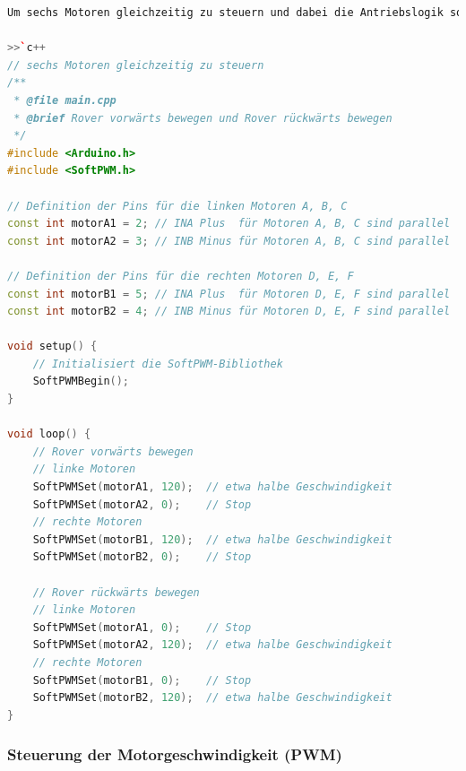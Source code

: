 \documentclass{vorlage-design-main}
\begin{document}
\begin{lstlisting}[language={C++}]
Um sechs Motoren gleichzeitig zu steuern und dabei die Antriebslogik sowie die Nutzung der SoftPWM-Bibliothek für das Arduino-Board zu berücksichtigen, muss der vorgegebene Code erweitert werden.

>>`c++
// sechs Motoren gleichzeitig zu steuern
/**
 * @file main.cpp
 * @brief Rover vorwärts bewegen und Rover rückwärts bewegen
 */
#include <Arduino.h>
#include <SoftPWM.h>

// Definition der Pins für die linken Motoren A, B, C
const int motorA1 = 2; // INA Plus  für Motoren A, B, C sind parallel
const int motorA2 = 3; // INB Minus für Motoren A, B, C sind parallel

// Definition der Pins für die rechten Motoren D, E, F
const int motorB1 = 5; // INA Plus  für Motoren D, E, F sind parallel
const int motorB2 = 4; // INB Minus für Motoren D, E, F sind parallel

void setup() {
    // Initialisiert die SoftPWM-Bibliothek
    SoftPWMBegin();
}

void loop() {
    // Rover vorwärts bewegen
    // linke Motoren
    SoftPWMSet(motorA1, 120);  // etwa halbe Geschwindigkeit
    SoftPWMSet(motorA2, 0);    // Stop
    // rechte Motoren
    SoftPWMSet(motorB1, 120);  // etwa halbe Geschwindigkeit
    SoftPWMSet(motorB2, 0);    // Stop

    // Rover rückwärts bewegen
    // linke Motoren
    SoftPWMSet(motorA1, 0);    // Stop
    SoftPWMSet(motorA2, 120);  // etwa halbe Geschwindigkeit
    // rechte Motoren
    SoftPWMSet(motorB1, 0);    // Stop
    SoftPWMSet(motorB2, 120);  // etwa halbe Geschwindigkeit
}
\end{lstlisting}

\hypertarget{steuerung-der-motorgeschwindigkeit-pwm}{%
\subsubsection{Steuerung der Motorgeschwindigkeit
(PWM)}\label{steuerung-der-motorgeschwindigkeit-pwm}}
\end{document}
